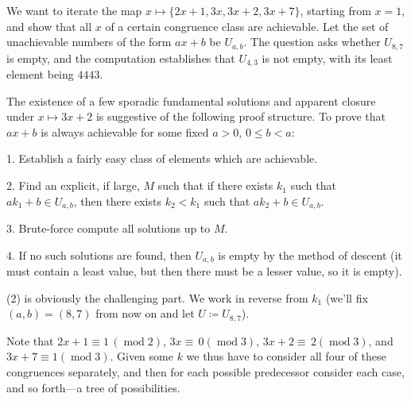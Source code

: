 \documentclass{article}
\begin{document}
We want to iterate the map $x\mapsto \{2x+1, 3x, 3x+2, 3x+7\}$, starting from $x=1$, and show that all $x$ of a certain congruence class are achievable. Let the set of unachievable numbers of the form $ax+b$ be $U_{a,b}$. The question asks whether $U_{8,7}$ is empty, and the computation establishes that $U_{4,3}$ is not empty, with its least element being $4443$.

The existence of a few sporadic fundamental solutions and apparent closure under $x\mapsto 3x+2$ is suggestive of the following proof structure. To prove that $ax+b$ is always achievable for some fixed $a>0$, $0\leq b<a$:

1. Establish a fairly easy class of elements which are achievable.

2. Find an explicit, if large, $M$ such that if there exists $k_1$ such that $ak_1+b\in U_{a,b}$, then there exists $k_2<k_1$ such that $ak_2+b\in U_{a,b}$.

3. Brute-force compute all solutions up to $M$.

4. If no such solutions are found, then $U_{a,b}$ is empty by the method of descent (it must contain a least value, but then there must be a lesser value, so it is empty).

(2) is obviously the challenging part. We work in reverse from $k_1$ (we'll fix $(a,b)=(8,7)$ from now on and let $U\coloneqq U_{8,7}$).

Note that $2x+1\equiv 1\,(\operatorname{mod} 2)$, $3x\equiv \,0(\operatorname{mod} 3)$, $3x+2\equiv \,2(\operatorname{mod} 3)$, and $3x+7\equiv 1(\operatorname{mod} 3)$. Given some $k$ we thus have to consider all four of these congruences separately, and then for each possible predecessor consider each case, and so forth---a tree of possibilities.
\end{document}
